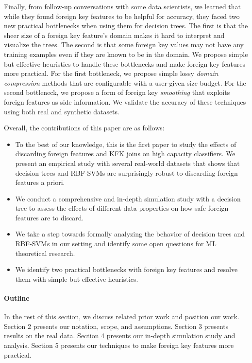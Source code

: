 \documentclass{vldb}
\newenvironment{packeditems}{
\begin{itemize}
  \setlength{\itemsep}{1pt}
  \setlength{\parskip}{0pt}
  \setlength{\parsep}{0pt}
}{\end{itemize}}
\begin{document}
Finally, from follow-up conversations with some data scientists, we learned that while they found foreign key features to be helpful for accuracy, they faced two new practical 
bottlenecks when using them for decision trees. The first is that the sheer size of a foreign key feature's domain makes it hard to interpret and visualize the trees. 
The second is that some foreign key values may not have any training examples even if they are known to be in the domain. 
We propose simple but effective heuristics to handle these bottlenecks and make foreign key features more practical. For the first bottleneck, we propose simple lossy 
\textit{domain compression} methods that are configurable with a user-given size budget. For the second bottleneck, we propose a form of foreign key \textit{smoothing} 
that exploits foreign features as side information. We validate the accuracy of these techniques using both real and synthetic datasets.

\vspace{1mm}
\noindent Overall, the contributions of this paper are as follows:

\begin{packeditems}
\item To the best of our knowledge, this is the first paper to study the effects of discarding foreign features and KFK joins on high capacity classifiers.
We present an empirical study with several real-world datasets that shows that decision trees and RBF-SVMs are surprisingly robust to discarding foreign features a priori.

\item We conduct a comprehensive and in-depth simulation study with a decision tree to assess the effects of different data properties on how safe foreign features are to discard.

\item We take a step towards formally analyzing the behavior of decision trees and RBF-SVMs in our setting and identify some open questions for ML theoretical research.

\item We identify two practical bottlenecks with foreign key features and resolve them with simple but effective heuristics.
\end{packeditems}


\paragraph*{\textbf{Outline}} In the rest of this section, we discuss related prior work and position our work. Section 2 presents our notation, scope, and assumptions. 
Section 3 presents results on the real data. Section 4 presents our in-depth simulation study and analysis. Section 5 presents our techniques to make foreign key features
more practical. %
\end{document}
